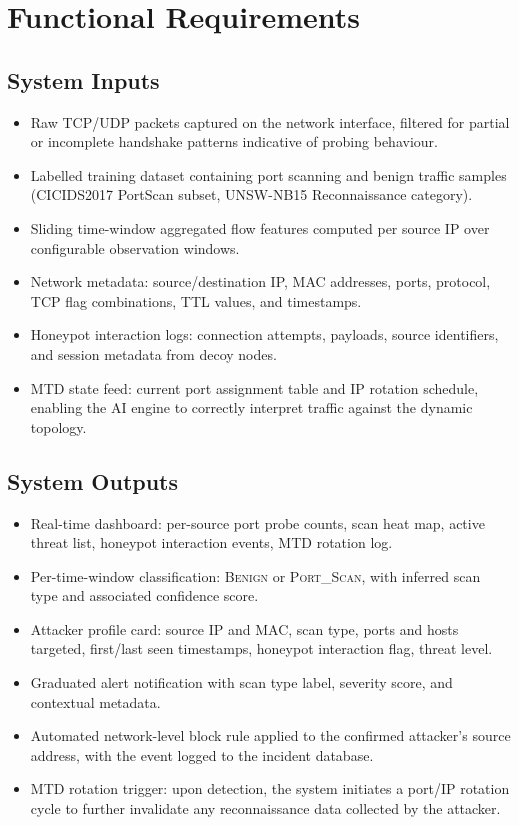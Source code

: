 \documentclass[12pt,a4paper]{report}
\begin{document}
\chapter{Functional Requirements}

\section{System Inputs}

\begin{itemize}[nosep, leftmargin=1.5em]
  \item Raw TCP/UDP packets captured on the network interface, filtered for partial or
        incomplete handshake patterns indicative of probing behaviour.
  \item Labelled training dataset containing port scanning and benign traffic samples
        (CICIDS2017 PortScan subset, UNSW-NB15 Reconnaissance category).
  \item Sliding time-window aggregated flow features computed per source IP over
        configurable observation windows.
  \item Network metadata: source/destination IP, MAC addresses, ports, protocol, TCP
        flag combinations, TTL values, and timestamps.
  \item Honeypot interaction logs: connection attempts, payloads, source identifiers, and
        session metadata from decoy nodes.
  \item MTD state feed: current port assignment table and IP rotation schedule, enabling
        the AI engine to correctly interpret traffic against the dynamic topology.
\end{itemize}

\section{System Outputs}

\begin{itemize}[nosep, leftmargin=1.5em]
  \item Real-time dashboard: per-source port probe counts, scan heat map, active threat
        list, honeypot interaction events, MTD rotation log.
  \item Per-time-window classification: \textsc{Benign} or \textsc{Port\_Scan}, with
        inferred scan type and associated confidence score.
  \item Attacker profile card: source IP and MAC, scan type, ports and hosts targeted,
        first/last seen timestamps, honeypot interaction flag, threat level.
  \item Graduated alert notification with scan type label, severity score, and contextual
        metadata.
  \item Automated network-level block rule applied to the confirmed attacker's source
        address, with the event logged to the incident database.
  \item MTD rotation trigger: upon detection, the system initiates a port/IP rotation cycle
        to further invalidate any reconnaissance data collected by the attacker.
\end{itemize}
\end{document}
